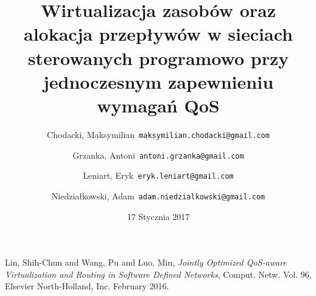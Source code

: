 \documentclass{article}
\title{Wirtualizacja zasobów oraz alokacja przepływów w sieciach sterowanych programowo przy jednoczesnym zapewnieniu wymagań QoS}
\author{
  Chodacki, Maksymilian\      \texttt{maksymilian.chodacki@gmail.com}
  \and
  Grzanka, Antoni\      \texttt{antoni.grzanka@gmail.com}
  \and
  Leniart, Eryk\      \texttt{eryk.leniart@gmail.com}
  \and
  Niedziałkowski, Adam\      \texttt{adam.niedzialkowski@gmail.com}
}
\date{17 Stycznia 2017}
\begin{document}
\maketitle









\begin{thebibliography}{9}

  Lin, Shih-Chun and Wang, Pu and Luo, Min,
  \emph{Jointly Optimized QoS-aware Virtualization and Routing in Software Defined Networks},
  Comput. Netw. Vol. 96,
  Elsevier North-Holland, Inc.
  February 2016.

\end{thebibliography}
\end{document}
